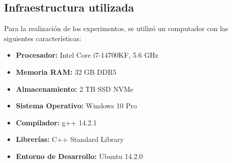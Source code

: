 
\subsection{Infraestructura utilizada}

Para la realización de los experimentos, se utilizó un computador con las siguientes características:

\begin{itemize}
    \item \textbf{Procesador:} Intel Core i7-14700KF, 5.6 GHz
    \item \textbf{Memoria RAM:} 32 GB DDR5
    \item \textbf{Almacenamiento:} 2 TB SSD NVMe
    \item \textbf{Sistema Operativo:} Windows 10 Pro
    \item \textbf{Compilador:} g++ 14.2.1
    \item \textbf{Librerías:} C++ Standard Library
    \item \textbf{Entorno de Desarrollo:} Ubuntu 14.2.0 
\end{itemize}

